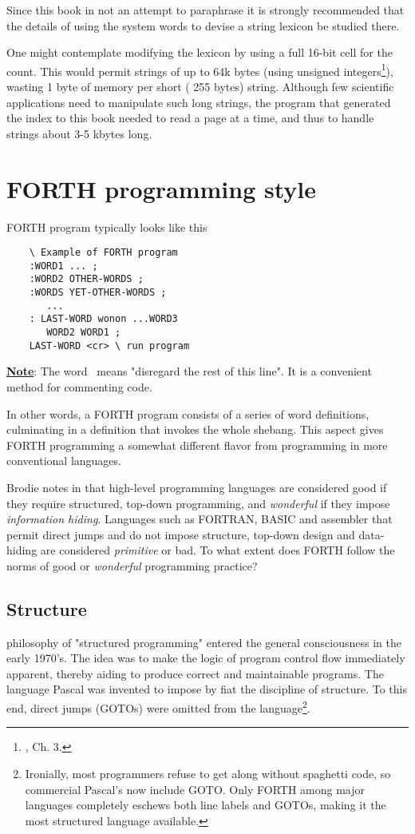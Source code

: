 Since this book in not an attempt to paraphrase \FTR it is strongly recommended that the details of using the system words to devise a string lexicon be studied there.

\leftbar[1\linewidth]
One might contemplate modifying the \FTR lexicon by using a full 16-bit cell for the count. This would permit strings of up to 64k bytes (using unsigned integers\footnote{\FTR, Ch. 3.}), wasting 1 byte of memory per short ( 255 bytes) string. Although few scientific applications need to manipulate such long strings, the program that generated the index to this book needed to read a page at a time, and thus to handle strings about 3-5 kbytes long.
\endleftbar 

\section{FORTH programming style}

 FORTH program typically looks like this
\begin{lstlisting}
    \ Example of FORTH program
    :WORD1 ... ;
    :WORD2 OTHER-WORDS ;
    :WORDS YET-OTHER-WORDS ;
       ...
    : LAST-WORD wonon ...WORD3
       WORD2 WORD1 ;
    LAST-WORD <cr> \ run program
\end{lstlisting}

\leftbar[1\linewidth]
\textbf{\underline{Note}}: The word \ means "disregard the rest of this line". It is a convenient method for commenting code.
\endleftbar

In other words, a FORTH program consists of a series of word definitions, culminating in a definition that invokes the whole shebang. This aspect gives FORTH programming a somewhat different ﬂavor from programming in more conventional languages.

Brodie notes in \TF that high-level programming languages are considered good if they require structured, top-down programming, and \textit{wonderful} if they impose \textit{information hiding}. Languages such as FORTRAN, BASIC and assembler that permit direct jumps and do not impose structure, top-down design and data-hiding are considered \textit{primitive} or bad. To what extent does FORTH follow the norms of good or \textit{wonderful} programming practice?

\subsection{Structure}

 philosophy of "structured programming" entered the general consciousness in the early 1970’s. The idea was to make the logic of program control flow immediately apparent, thereby aiding to produce correct and maintainable programs. The language Pascal was invented to impose by fiat the discipline of structure. To this end, direct jumps (GOTOs) were omitted from the language\footnote{Ironially, most programmers refuse to get along without spaghetti code, so commercial Pascal's now include GOTO. Only FORTH among major languages completely eschews both line labels and GOTOs, making it the most structured language available.}.


